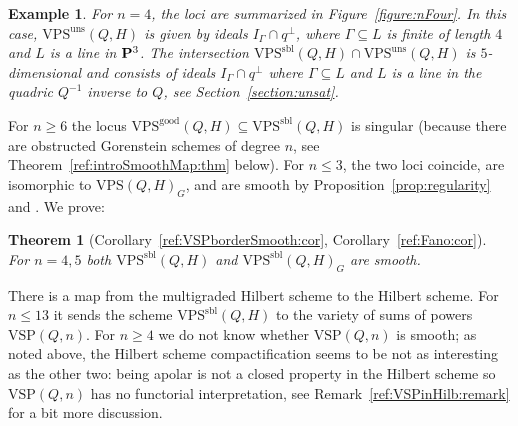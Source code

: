 \documentclass{amsart}
\newcommand{\PP}{{\bf P}}
\newcommand{\VPSsbl}{{\mathrm{VPS}}^{\mathrm{sbl}}(Q, H)}
\newcommand{\VPSuns}{{\mathrm{VPS}}^{\mathrm{uns}}(Q, H)}
\newcommand{\VPSgood}{{\mathrm{VPS}}^{\mathrm{good}}(Q, H)}
\newcommand{\VPS}{\mathrm{VPS}(Q, H)}
\newcommand{\VSPn}{\mathrm{VSP}(Q, n)}
\newtheorem{theorem}[lemma]{\bf Theorem}
\newtheorem{example}[lemma]{\bf Example}
\begin{document}
\begin{example}{\rm
    For $n=4$, the loci are summarized in Figure~\ref{figure:nFour}.
    In this case, $\VPSuns$ is given by ideals $I_\Gamma\cap q^\perp$,
    where $\Gamma \subseteq L$ is finite of length $4$ and $L$ is a line in $\PP^3$.
    The intersection $\VPSsbl\cap \VPSuns$ is $5$-dimensional and consists of ideals $I_\Gamma\cap q^\perp$ where
    $\Gamma \subseteq L$ and $L$ is a line in the quadric
    $Q^{-1}$ inverse to $Q$, see
    Section~\ref{section:unsat}.}
\end{example}


For $n\geq 6$ the locus $\VPSgood \subseteq \VPSsbl$ is singular (because
there are obstructed
Gorenstein schemes of degree $n$, see Theorem~\ref{ref:introSmoothMap:thm}
below). For $n\leq 3$, the two loci coincide, are isomorphic to $\VPS_G$, and are smooth by Proposition~\ref{prop:regularity} and \cite[Proposition 10]{Mukai}. We prove:
\begin{theorem}[{Corollary~\ref{ref:VSPborderSmooth:cor},
    Corollary~\ref{ref:Fano:cor}}]\label{ref:introSmoothness:thm}
    For $n=4,5$ both $\VPSsbl$ and $\VPSsbl_G$ are smooth.
\end{theorem}
There is a map from the multigraded Hilbert scheme to the Hilbert scheme. For
$n\leq 13$ it sends the scheme $\VPSsbl$ to the variety of sums of powers $\VSPn$. 
For $n\geq 4$ we do not know whether $\VSPn$ is smooth; as noted above, the Hilbert scheme
compactification seems to be not as interesting as the other two: being apolar is not a
closed property in the Hilbert scheme so $\VSPn$ has no functorial interpretation, see
Remark~\ref{ref:VSPinHilb:remark} for a bit more discussion.
\end{document}
